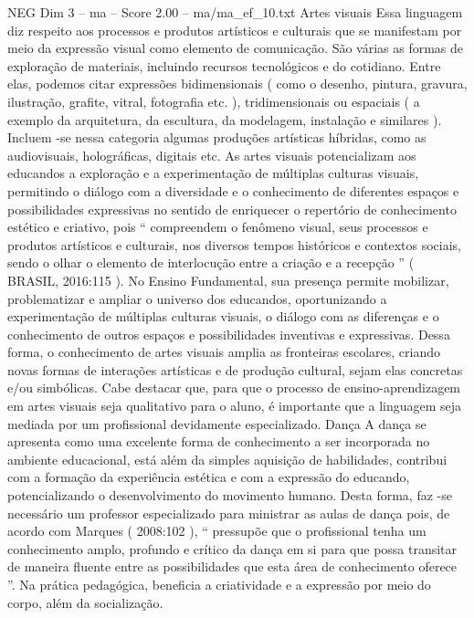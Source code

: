 \begin{textsample}{NEG Dim 3 – ma – Score 2.00 – ma/ma\_ef\_10.txt}  \label{ex:f3_neg_149}
Artes visuais Essa linguagem diz respeito aos processos e produtos artísticos e culturais que se manifestam por meio da expressão visual como elemento de comunicação.
São várias as formas de exploração de materiais, incluindo recursos tecnológicos e do cotidiano.
Entre elas, podemos citar expressões bidimensionais ( como o desenho, pintura, gravura, ilustração, grafite, vitral, fotografia etc. ), tridimensionais ou espaciais ( a exemplo da arquitetura, da escultura, da modelagem, instalação e similares ).
Incluem -se nessa categoria algumas produções artísticas híbridas, como as audiovisuais, holográficas, digitais etc.
As artes visuais potencializam aos educandos a exploração e a experimentação de múltiplas culturas visuais, permitindo o diálogo com a diversidade e o conhecimento de diferentes espaços e possibilidades expressivas no sentido de enriquecer o repertório de conhecimento estético e criativo, pois “ compreendem o fenômeno visual, seus processos e produtos artísticos e culturais, nos diversos tempos históricos e contextos sociais, sendo o olhar o elemento de interlocução entre a criação e a recepção ” ( BRASIL, 2016:115 ).
No Ensino Fundamental, sua presença permite mobilizar, problematizar e ampliar o universo dos educandos, oportunizando a experimentação de múltiplas culturas visuais, o diálogo com as diferenças e o conhecimento de outros espaços e possibilidades inventivas e expressivas.
Dessa forma, o conhecimento de artes visuais amplia as fronteiras escolares, criando novas formas de interações artísticas e de produção cultural, sejam elas concretas e/ou simbólicas.
Cabe destacar que, para que o processo de ensino-aprendizagem em artes visuais seja qualitativo para o aluno, é importante que a linguagem seja mediada por um profissional devidamente especializado.
Dança A dança se apresenta como uma excelente forma de conhecimento a ser incorporada no ambiente educacional, está além da simples aquisição de habilidades, contribui com a formação da experiência estética e com a expressão do educando, potencializando o desenvolvimento do movimento humano.
Desta forma, faz -se necessário um professor especializado para ministrar as aulas de dança pois, de acordo com Marques ( 2008:102 ), “ pressupõe que o profissional tenha um conhecimento amplo, profundo e crítico da dança em si para que possa transitar de maneira fluente entre as possibilidades que esta área de conhecimento oferece ”.
Na prática pedagógica, beneficia a criatividade e a expressão por meio do corpo, além da socialização.

\end{textsample}
